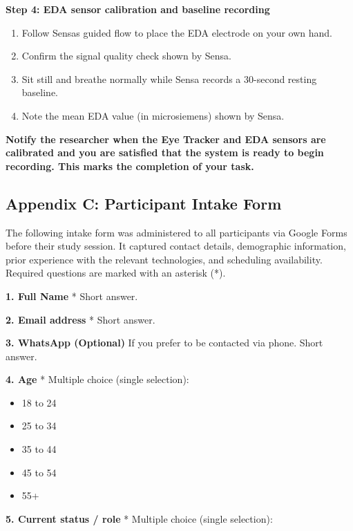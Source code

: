 \documentclass[
]{article}
\begin{document}
\textbf{Step 4: EDA sensor calibration and baseline recording}

\begin{enumerate}
\def\labelenumi{\arabic{enumi}.}
\item
  Follow Sensa\textquotesingle s guided flow to place the EDA electrode on your own hand.
\item
  Confirm the signal quality check shown by Sensa.
\item
  Sit still and breathe normally while Sensa records a 30-second resting baseline.
\item
  Note the mean EDA value (in microsiemens) shown by Sensa.
\end{enumerate}

\textbf{Notify the researcher when the Eye Tracker and EDA sensors are calibrated and you are satisfied that the system is ready to begin recording. This marks the completion of your task.}

\clearpage
\hypertarget{appendix-b-participant-intake-form}{%
\subsection{\texorpdfstring{Appendix C: Participant Intake Form }{Appendix C: Participant Intake Form }}\label{appendix-b-participant-intake-form}}

The following intake form was administered to all participants via Google Forms before their study session. It captured contact details, demographic information, prior experience with the relevant technologies, and scheduling availability. Required questions are marked with an asterisk (*).

\textbf{1. Full Name} * Short answer.

\textbf{2. Email address} * Short answer.

\textbf{3. WhatsApp (Optional)} If you prefer to be contacted via phone. Short answer.

\textbf{4. Age} * Multiple choice (single selection):

\begin{itemize}
\item
  18 to 24
\item
  25 to 34
\item
  35 to 44
\item
  45 to 54
\item
  55+
\end{itemize}

\textbf{5. Current status / role} * Multiple choice (single selection):
\end{document}

